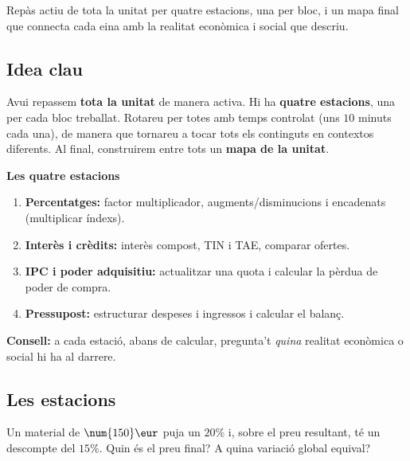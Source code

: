 %
{Repàs actiu de tota la unitat per quatre estacions, una per bloc, i un mapa final que connecta cada eina amb la realitat econòmica i social que descriu.}

\subsection{Idea clau}

Avui repassem \textbf{tota la unitat} de manera activa. Hi ha \textbf{quatre
estacions}, una per cada bloc treballat. Rotareu per totes amb temps controlat (uns
$10$ minuts cada una), de manera que tornareu a tocar tots els continguts en contextos
diferents. Al final, construirem entre tots un \textbf{mapa de la unitat}.

\begin{idea}
\textbf{Les quatre estacions}
\begin{enumerate}[leftmargin=1.6em, itemsep=2pt]
  \item \textbf{Percentatges:} factor multiplicador, augments/disminucions i
        encadenats (multiplicar índexs).
  \item \textbf{Interès i crèdits:} interès compost, TIN i TAE, comparar ofertes.
  \item \textbf{IPC i poder adquisitiu:} actualitzar una quota i calcular la pèrdua de
        poder de compra.
  \item \textbf{Pressupost:} estructurar despeses i ingressos i calcular el balanç.
\end{enumerate}
\textbf{Consell:} a cada estació, abans de calcular, pregunta't \emph{quina} realitat
econòmica o social hi ha al darrere.
\end{idea}

\subsection{Les estacions}

\begin{exemple}
Un material de $\num{150}\eur$ puja un $20\%$ i, sobre el preu resultant, té un
descompte del $15\%$. Quin és el preu final? A quina variació global equival?
\end{exemple}


